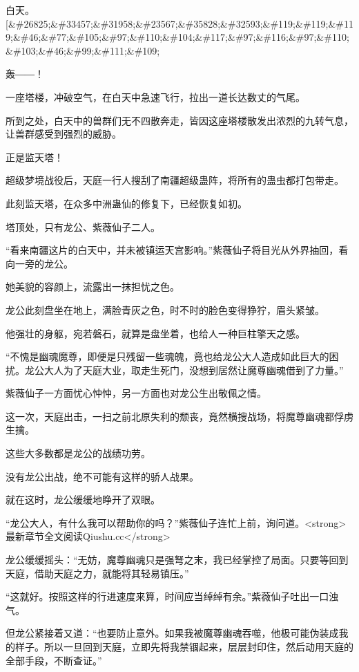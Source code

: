 
\begin{this_body}

白天。[\&\#26825;\&\#33457;\&\#31958;\&\#23567;\&\#35828;\&\#32593;\&\#119;\&\#119;\&\#119;\&\#46;\&\#77;\&\#105;\&\#97;\&\#110;\&\#104;\&\#117;\&\#97;\&\#116;\&\#97;\&\#110;\&\#103;\&\#46;\&\#99;\&\#111;\&\#109;

轰――！

一座塔楼，冲破空气，在白天中急速飞行，拉出一道长达数丈的气尾。

所到之处，白天中的兽群们无不四散奔走，皆因这座塔楼散发出浓烈的九转气息，让兽群感受到强烈的威胁。

正是监天塔！

超级梦境战役后，天庭一行人搜刮了南疆超级蛊阵，将所有的蛊虫都打包带走。

此刻监天塔，在众多中洲蛊仙的修复下，已经恢复如初。

塔顶处，只有龙公、紫薇仙子二人。

“看来南疆这片的白天中，并未被镇运天宫影响。”紫薇仙子将目光从外界抽回，看向一旁的龙公。

她美貌的容颜上，流露出一抹担忧之色。

龙公此刻盘坐在地上，满脸青灰之色，时不时的脸色变得狰狞，眉头紧皱。

他强壮的身躯，宛若磐石，就算是盘坐着，也给人一种巨柱擎天之感。

“不愧是幽魂魔尊，即便是只残留一些魂魄，竟也给龙公大人造成如此巨大的困扰。龙公大人为了天庭大业，取走生死门，没想到居然让魔尊幽魂借到了力量。”

紫薇仙子一方面忧心忡忡，另一方面也对龙公生出敬佩之情。

这一次，天庭出击，一扫之前北原失利的颓丧，竟然横搜战场，将魔尊幽魂都俘虏生擒。

这些大多数都是龙公的战绩功劳。

没有龙公出战，绝不可能有这样的骄人战果。

就在这时，龙公缓缓地睁开了双眼。

“龙公大人，有什么我可以帮助你的吗？”紫薇仙子连忙上前，询问道。<strong>最新章节全文阅读Qiushu.cc</strong>

龙公缓缓摇头：“无妨，魔尊幽魂只是强弩之末，我已经掌控了局面。只要等回到天庭，借助天庭之力，就能将其轻易镇压。”

“这就好。按照这样的行进速度来算，时间应当绰绰有余。”紫薇仙子吐出一口浊气。

但龙公紧接着又道：“也要防止意外。如果我被魔尊幽魂吞噬，他极可能伪装成我的样子。所以一旦回到天庭，立即先将我禁锢起来，层层封印住，然后动用天庭的全部手段，不断查证。”


\end{this_body}
